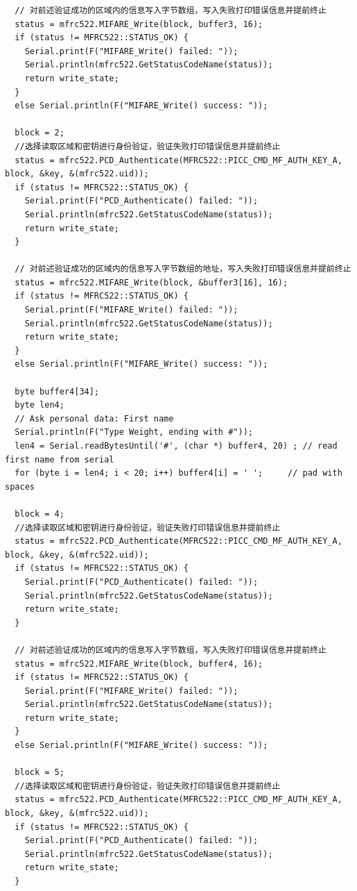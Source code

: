 \documentclass{article}
\begin{document}
\begin{lstlisting}
  // 对前述验证成功的区域内的信息写入字节数组，写入失败打印错误信息并提前终止
  status = mfrc522.MIFARE_Write(block, buffer3, 16);
  if (status != MFRC522::STATUS_OK) {
    Serial.print(F("MIFARE_Write() failed: "));
    Serial.println(mfrc522.GetStatusCodeName(status));
    return write_state;
  }
  else Serial.println(F("MIFARE_Write() success: "));

  block = 2;
  //选择读取区域和密钥进行身份验证，验证失败打印错误信息并提前终止
  status = mfrc522.PCD_Authenticate(MFRC522::PICC_CMD_MF_AUTH_KEY_A, block, &key, &(mfrc522.uid));
  if (status != MFRC522::STATUS_OK) {
    Serial.print(F("PCD_Authenticate() failed: "));
    Serial.println(mfrc522.GetStatusCodeName(status));
    return write_state;
  }

  // 对前述验证成功的区域内的信息写入字节数组的地址，写入失败打印错误信息并提前终止
  status = mfrc522.MIFARE_Write(block, &buffer3[16], 16);
  if (status != MFRC522::STATUS_OK) {
    Serial.print(F("MIFARE_Write() failed: "));
    Serial.println(mfrc522.GetStatusCodeName(status));
    return write_state;
  }
  else Serial.println(F("MIFARE_Write() success: "));

  byte buffer4[34];
  byte len4;
  // Ask personal data: First name
  Serial.println(F("Type Weight, ending with #"));
  len4 = Serial.readBytesUntil('#', (char *) buffer4, 20) ; // read first name from serial
  for (byte i = len4; i < 20; i++) buffer4[i] = ' ';     // pad with spaces

  block = 4;
  //选择读取区域和密钥进行身份验证，验证失败打印错误信息并提前终止
  status = mfrc522.PCD_Authenticate(MFRC522::PICC_CMD_MF_AUTH_KEY_A, block, &key, &(mfrc522.uid));
  if (status != MFRC522::STATUS_OK) {
    Serial.print(F("PCD_Authenticate() failed: "));
    Serial.println(mfrc522.GetStatusCodeName(status));
    return write_state;
  }

  // 对前述验证成功的区域内的信息写入字节数组，写入失败打印错误信息并提前终止
  status = mfrc522.MIFARE_Write(block, buffer4, 16);
  if (status != MFRC522::STATUS_OK) {
    Serial.print(F("MIFARE_Write() failed: "));
    Serial.println(mfrc522.GetStatusCodeName(status));
    return write_state;
  }
  else Serial.println(F("MIFARE_Write() success: "));

  block = 5;
  //选择读取区域和密钥进行身份验证，验证失败打印错误信息并提前终止
  status = mfrc522.PCD_Authenticate(MFRC522::PICC_CMD_MF_AUTH_KEY_A, block, &key, &(mfrc522.uid));
  if (status != MFRC522::STATUS_OK) {
    Serial.print(F("PCD_Authenticate() failed: "));
    Serial.println(mfrc522.GetStatusCodeName(status));
    return write_state;
  }


\end{lstlisting}
\end{document}
